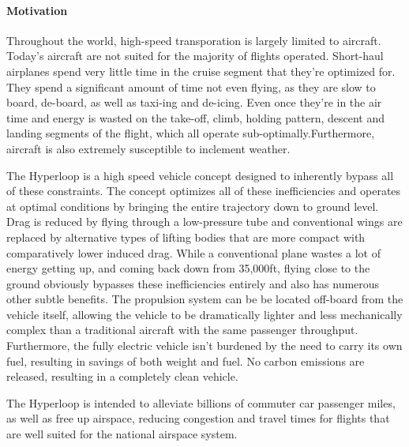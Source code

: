 \paragraph{Motivation}

	Throughout the world, high-speed transporation is largely limited to aircraft.
	Today's aircraft are not suited for the majority of flights operated.
	Short-haul airplanes spend very little time in the cruise segment that they're optimized for.
	They spend a significant amount of time not even flying,
	as they are slow to board, de-board, as well as taxi-ing and de-icing.
	Even once they're in the air time and energy is wasted on the take-off, climb,
	holding pattern, descent and landing segments of the flight, which all operate
	sub-optimally.Furthermore, aircraft is also extremely susceptible to inclement weather.

	The Hyperloop is a high speed vehicle concept designed to inherently bypass
	all of these constraints.
	The concept optimizes all of these inefficiencies and operates at
	optimal conditions by bringing the entire trajectory down to ground level.
	Drag is reduced by flying through a low-pressure tube
	and conventional wings are replaced by alternative types of lifting bodies
	that are more compact with comparatively lower induced drag.
	While a conventional plane wastes a lot of energy getting up,
	and coming back down from 35,000ft,
	flying close to the ground obviously bypasses these inefficiencies entirely
	and also has numerous other subtle benefits.
	The propulsion system can be be located off-board from the vehicle itself,
	allowing the vehicle to be dramatically lighter and less mechanically complex than a
	traditional aircraft with the same passenger throughput.
	Furthermore, the fully electric vehicle isn't burdened by the need to carry its own fuel,
	resulting in savings of both weight and fuel. No carbon emissions are released,
	resulting in a completely clean vehicle.

	The Hyperloop is intended to alleviate billions of commuter car passenger miles,
	as well as free up airspace, reducing congestion and travel times for
	flights that are well suited for the national airspace system.

